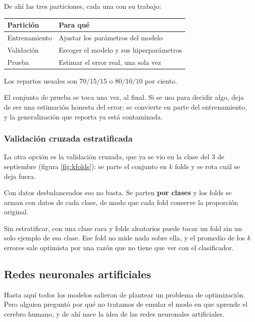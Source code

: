 \documentclass[11pt,letterpaper]{article}
\begin{document}
De ahí las tres particiones, cada una con su trabajo:

\begin{center}
\begin{tabular}{ll}
  \toprule
  \textbf{Partición} & \textbf{Para qué} \\
  \midrule
  Entrenamiento & Ajustar los parámetros del modelo \\
  Validación    & Escoger el modelo y sus hiperparámetros \\
  Prueba        & Estimar el error real, una sola vez \\
  \bottomrule
\end{tabular}
\end{center}

Los repartos usuales son $70/15/15$ o $80/10/10$ por ciento.

\begin{ojo}
  El conjunto de prueba se toca una vez, al final. Si se usa para
  decidir algo, deja de ser una estimación honesta del error: se
  convierte en parte del entrenamiento, y la generalización que
  reporta ya está contaminada.
\end{ojo}

\subsubsection*{Validación cruzada estratificada}

La otra opción es la validación cruzada, que ya se vio en la clase
del 3 de septiembre (figura \ref{fig:kfolds}): se parte el conjunto en
$k$ folds y se rota cuál se deja fuera.

Con datos desbalanceados eso no basta. Se parten \textbf{por clases} y
los folds se arman con datos de cada clase, de modo que cada fold
conserve la proporción original.

\begin{idea}
  Sin estratificar, con una clase rara y folds aleatorios puede tocar
  un fold sin un solo ejemplo de esa clase. Ese fold no mide nada
  sobre ella, y el promedio de los $k$ errores sale optimista por una
  razón que no tiene que ver con el clasificador.
\end{idea}

\subsection*{Redes neuronales artificiales}

Hasta aquí todos los modelos salieron de plantear un problema de
optimización. Pero alguien preguntó por qué no tratamos de emular el
modo en que aprende el cerebro humano, y de ahí nace la idea de las
redes neuronales artificiales.
\end{document}
